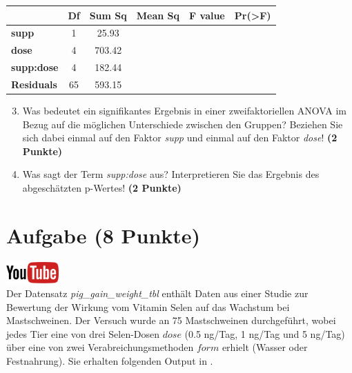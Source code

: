\documentclass[a4paper, 10pt]{scrartcl}\usepackage[]{graphicx}\usepackage[]{xcolor}
\begin{document}
\vspace{1Ex}

\begin{center}
  \Large
  \begin{tabular}{l|c|c|c|c|c}
     & \textbf{Df} & \textbf{Sum Sq} & \textbf{Mean Sq} & \textbf{F value} & \textbf{Pr(>F)} \strut\\
    \hline
   \textbf{supp}  & 1 & 25.93 &  &  &  \strut\\
    \hline
    \textbf{dose}  & 4 & 703.42 &  &  &  \strut\\
    \hline
    \textbf{supp:dose}  & 4 & 182.44 &  &  &  \strut\\
    \hline
   \textbf{Residuals}  & 65 & 593.15 &  &  &  \strut\\
  \end{tabular}
\end{center}

\vspace{1Ex}

\begin{enumerate}
  \setcounter{enumi}{2}
\item Was bedeutet ein signifikantes Ergebnis in einer zweifaktoriellen
  ANOVA im Bezug auf die m{\"o}glichen Unterschiede zwischen den Gruppen?
  Beziehen Sie sich dabei einmal auf den Faktor \textit{supp} und einmal
  auf den Faktor \textit{dose}! \textbf{(2 Punkte)}
\item Was sagt der Term \textit{supp:dose} aus? Interpretieren Sie das
  Ergebnis des abgesch{\"a}tzten p-Wertes! \textbf{(2 Punkte)}
\end{enumerate}
 
\clearpage

\section{Aufgabe \hfill (8 Punkte)}

\hfill\href{https://youtu.be/rWTyHXXlYjY}{\includegraphics[width =
  2cm]{img/youtube}}\\[1Ex]


Der Datensatz \textit{pig\_gain\_weight\_tbl} enth{\"a}lt Daten aus einer Studie zur Bewertung
der Wirkung vom Vitamin Selen auf das Wachstum bei Mastschweinen. Der
Versuch wurde an 75 Mastschweinen durchgef{\"u}hrt, wobei
jedes Tier eine von drei Selen-Dosen $dose$ (0.5 ng/Tag, 1 ng/Tag und 5 ng/Tag)
{\"u}ber eine von zwei Verabreichungsmethoden $form$ erhielt (Wasser oder
Festnahrung). Sie erhalten folgenden Output in \Rlogo.
\end{document}
